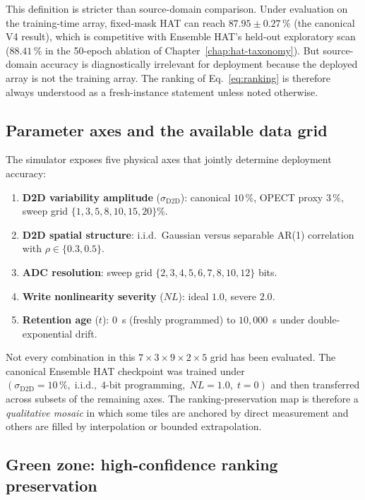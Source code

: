 This definition is stricter than source-domain comparison.  Under evaluation on the training-time array, fixed-mask HAT can reach $87.95\pm0.27\,\%$ (the canonical V4 result), which is competitive with Ensemble HAT's held-out exploratory scan ($88.41\,\%$ in the 50-epoch ablation of Chapter~\ref{chap:hat-taxonomy}).  But source-domain accuracy is diagnostically irrelevant for deployment because the deployed array is not the training array.  The ranking of Eq.~\ref{eq:ranking} is therefore always understood as a fresh-instance statement unless noted otherwise.

\subsection{Parameter axes and the available data grid}

The simulator exposes five physical axes that jointly determine deployment accuracy:
\begin{enumerate}
    \item \textbf{D2D variability amplitude} ($\sigma_{\mathrm{D2D}}$): canonical $10\,\%$, OPECT proxy $3\,\%$, sweep grid $\{1,3,5,8,10,15,20\}\%$.
    \item \textbf{D2D spatial structure}: i.i.d.~Gaussian versus separable AR(1) correlation with $\rho \in \{0.3, 0.5\}$.
    \item \textbf{ADC resolution}: sweep grid $\{2,3,4,5,6,7,8,10,12\}$ bits.
    \item \textbf{Write nonlinearity severity} ($NL$): ideal $1.0$, severe $2.0$.
    \item \textbf{Retention age} ($t$): $0$~s (freshly programmed) to $10{,}000$~s under double-exponential drift.
\end{enumerate}

Not every combination in this $7 \times 3 \times 9 \times 2 \times 5$ grid has been evaluated.  The canonical Ensemble HAT checkpoint was trained under $(\sigma_{\mathrm{D2D}}=10\,\%,\; \text{i.i.d.},\; 4\text{-bit programming},\; NL=1.0,\; t=0)$ and then transferred across subsets of the remaining axes.  The ranking-preservation map is therefore a \emph{qualitative mosaic} in which some tiles are anchored by direct measurement and others are filled by interpolation or bounded extrapolation.

\subsection{Green zone: high-confidence ranking preservation}

